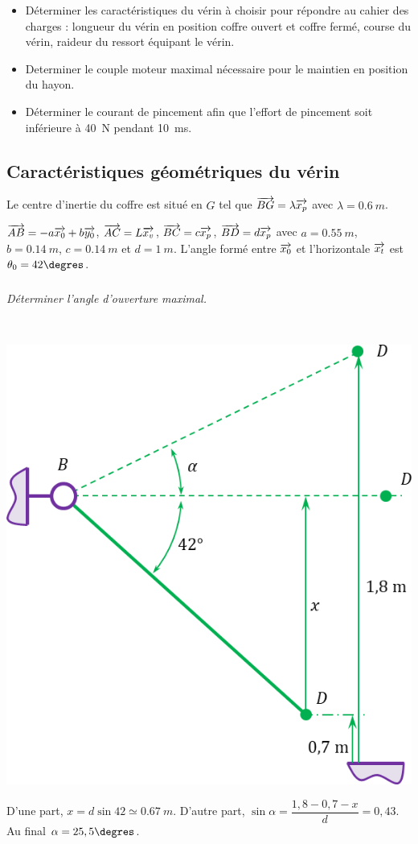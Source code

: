 \documentclass[10pt,fleqn]{article} %
\begin{document}
\begin{multicols}{2}
\begin{obj}
\begin{itemize}
\item Déterminer les caractéristiques du vérin à choisir pour répondre au cahier des charges : longueur
du vérin en position coffre ouvert et coffre fermé, course du vérin, raideur du ressort équipant le
vérin. 
\item Determiner le couple moteur maximal nécessaire pour le maintien en position du hayon.
\item Déterminer le courant de pincement afin que l'effort de pincement soit inférieure à \SI{40}{N} pendant \SI{10}{ms}.
\end{itemize}
\end{obj}


\subsection*{Caractéristiques géométriques du vérin}
Le centre d’inertie du coffre est situé en $G$ tel que $\overrightarrow{BG}=\lambda\overrightarrow{x_p}$ avec $\lambda=\SI{0,6}{m}$.

$\overrightarrow{AB}=-a\overrightarrow{x_0}+b\overrightarrow{y_0}$, $\overrightarrow{AC}=L\overrightarrow{x_v}$, $\overrightarrow{BC}=c\overrightarrow{x_p}$, $\overrightarrow{BD}=d\overrightarrow{x_p}$ avec $a=\SI{0,55}{m}$, $b=\SI{0,14}{m}$, $c=\SI{0,14}{m}$  et $d=\SI{1}{m}$. L’angle formé entre $\overrightarrow{x_0}$ et l’horizontale $\overrightarrow{x_t}$ est $\theta_0 = 42\degres$.

\subparagraph{}
\textit{Déterminer l’angle d’ouverture maximal.}
\ifprof
\begin{corrige}~\\
\begin{center}
\includegraphics[width=\linewidth]{images/cor_01}
\end{center}
D'une part, $x = d\sin 42 \simeq \SI{0,67}{m}$. D'autre part, $\sin\alpha = \dfrac{1,8-0,7-x}{d}=0,43$. Au final $\alpha = 25,5\degres$. 


\end{corrige}
\end{multicols}
\end{document}
